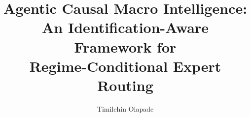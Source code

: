 \documentclass[11pt,a4paper]{article}
\title{Agentic Causal Macro Intelligence:\\An Identification-Aware Framework for\\Regime-Conditional Expert Routing}
\author{Timilehin Olapade}
\begin{document}
\maketitle
\begin{abstract}\end{abstract}





\clearpage\appendix

\end{document}
